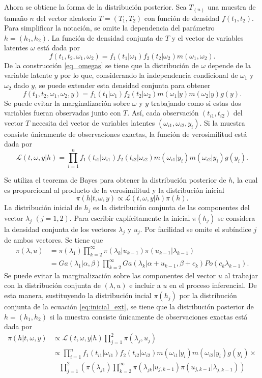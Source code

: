 \documentclass[11pt,a4paper]{article}
\begin{document}
Ahora se obtiene la forma de la distribución posterior. Sea $T_{(n)}$ una muestra de tamaño $n$ del vector aleatorio $T=(T_1, T_2)$ con función de densidad $f(t_1, t_2)$. Para simplificar la notación, se omite la dependencia del parámetro $h = (h_1, h_2).$ La función de densidad conjunta de $T$ y el vector de variables latentes $\omega$ está dada por $$f(t_1, t_2, \omega_1, \omega_2) = f_1(t_1|\omega_1)f_2(t_2|\omega_2)m(\omega_1, \omega_2).$$ De la construcción \eqref{eq_omegas} se tiene que la distribución de $\omega$ depende de la variable latente $y$ por lo que, considerando la independencia condicional de $\omega_1$ y $\omega_2$ dado $y$, se puede extender esta densidad conjunta para obtener
$$f(t_1, t_2, \omega_1, \omega_2, y)= f_1(t_1|\omega_1)f_2(t_2|\omega_2)m(\omega_1|y)m(\omega_2|y)g(y).$$ Se puede evitar la marginalización sobre $\omega$ y $y$ trabajando como si estas dos variables fueran observadas junto con $T$. Así, cada observación $(t_{i1}, t_{i2})$ del vector $T$ necesita del vector de variables latentes $(\omega_{i1}, \omega_{i2}, y_i)$. Si la muestra consiste únicamente de observaciones exactas, la función de verosimilitud está dada por 
$$\mathcal{L}(t, \omega, y | h) = \prod_{i=1}^n f_1(t_{i1}|\omega_{i1})f_2(t_{i2}|\omega_{i2})m(\omega_{i1}|y_i)m(\omega_{i2}|y_i)g(y_i).$$

Se utiliza el teorema de Bayes para obtener la distribución posterior de $h$, la cual es proporcional al producto de la verosimilitud y la distribución inicial $$\pi(h | t, \omega, y) \propto \mathcal{L}(t, \omega, y | h) \pi(h).$$ La distribución inicial de $h_j$ es la distribución conjunta de las componentes del vector $\lambda_j$ $(j = 1, 2)$. Para escribir explícitamente la inicial $\pi(h_j)$ se considera la densidad conjunta de los vectores $\lambda_j$ y $u_j$. Por facilidad se omite el subíndice $j$ de ambos vectores. Se tiene que
\begin{align}
\label{eq:inicial_ext}
    \pi(\lambda, u) &= \pi(\lambda_1) \prod_{k = 2}^\infty \pi(\lambda_k | u_{k-1})\pi(u_{k-1}|\lambda_{k-1})\\
    & = Ga(\lambda_1 | \alpha, \beta) \prod_{k = 2}^\infty Ga(\lambda_k | \alpha + u_{k-1}, \beta + c_k) Po(c_k\lambda_{k-1}).\nonumber
\end{align}
Se puede evitar la marginalización sobre las componentes del vector $u$ al trabajar con la distribución conjunta de $(\lambda, u)$ e incluir a $u$ en el proceso inferencial. De esta manera, sustituyendo la distribución incial $\pi(h_j)$ por la distribución conjunta de la ecuación \eqref{eq:inicial_ext}, se tiene que la distribución posterior de $h = (h_1, h_2)$ si la muestra consiste únicamente de observaciones exactas está dada por
\begin{align*}
    \pi(h | t, \omega, y) &\propto \mathcal{L}(t, \omega, y | h) \prod_{j = 1}^2 \pi(\lambda_j, u_j)\\
    &\propto \prod_{i=1}^n f_1(t_{i1}|\omega_{i1})f_2(t_{i2}|\omega_{i2})m(\omega_{i1}|y_i)m(\omega_{i2}|y_i)g(y_i)\times \\
    &\ \ \ \ \prod_{j = 1}^2 \left(\pi(\lambda_{j1})\prod_{k = 2}^\infty \pi(\lambda_{jk} | u_{j,k-1})\pi(u_{j,k-1}|\lambda_{j,k-1})\right)
\end{align*}
\end{document}
